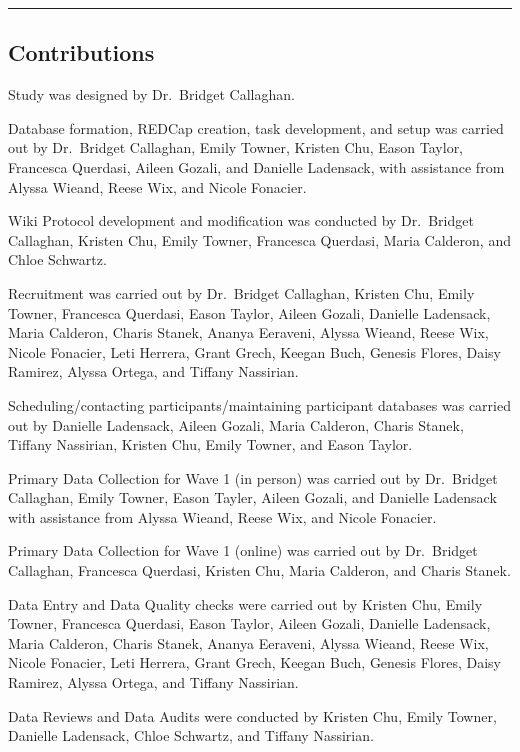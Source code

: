 \documentclass[]{book}
\begin{document}
\begin{center}\rule{0.5\linewidth}{0.5pt}\end{center}

\hypertarget{contributions}{%
\subsection{Contributions}\label{contributions}}

Study was designed by Dr.~Bridget Callaghan.

Database formation, REDCap creation, task development, and setup was carried out by Dr.~Bridget Callaghan, Emily Towner, Kristen Chu, Eason Taylor, Francesca Querdasi, Aileen Gozali, and Danielle Ladensack, with assistance from Alyssa Wieand, Reese Wix, and Nicole Fonacier.

Wiki Protocol development and modification was conducted by Dr.~Bridget Callaghan, Kristen Chu, Emily Towner, Francesca Querdasi, Maria Calderon, and Chloe Schwartz.

Recruitment was carried out by Dr.~Bridget Callaghan, Kristen Chu, Emily Towner, Francesca Querdasi, Eason Taylor, Aileen Gozali, Danielle Ladensack, Maria Calderon, Charis Stanek, Ananya Eeraveni, Alyssa Wieand, Reese Wix, Nicole Fonacier, Leti Herrera, Grant Grech, Keegan Buch, Genesis Flores, Daisy Ramirez, Alyssa Ortega, and Tiffany Nassirian.

Scheduling/contacting participants/maintaining participant databases was carried out by Danielle Ladensack, Aileen Gozali, Maria Calderon, Charis Stanek, Tiffany Nassirian, Kristen Chu, Emily Towner, and Eason Taylor.

Primary Data Collection for Wave 1 (in person) was carried out by Dr.~Bridget Callaghan, Emily Towner, Eason Tayler, Aileen Gozali, and Danielle Ladensack with assistance from Alyssa Wieand, Reese Wix, and Nicole Fonacier.

Primary Data Collection for Wave 1 (online) was carried out by Dr.~Bridget Callaghan, Francesca Querdasi, Kristen Chu, Maria Calderon, and Charis Stanek.

Data Entry and Data Quality checks were carried out by Kristen Chu, Emily Towner, Francesca Querdasi, Eason Taylor, Aileen Gozali, Danielle Ladensack, Maria Calderon, Charis Stanek, Ananya Eeraveni, Alyssa Wieand, Reese Wix, Nicole Fonacier, Leti Herrera, Grant Grech, Keegan Buch, Genesis Flores, Daisy Ramirez, Alyssa Ortega, and Tiffany Nassirian.

Data Reviews and Data Audits were conducted by Kristen Chu, Emily Towner, Danielle Ladensack, Chloe Schwartz, and Tiffany Nassirian.
\end{document}

